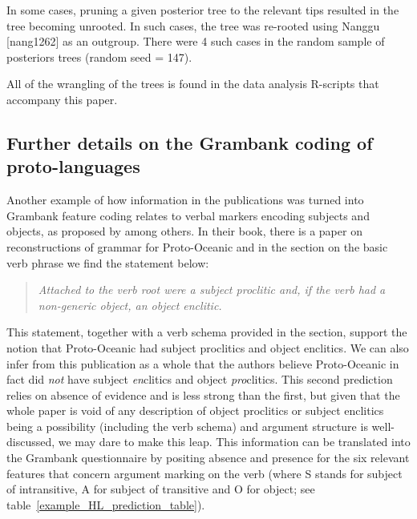 \documentclass[12pt,letterpaper]{article}
\begin{document}
In some cases, pruning a given posterior tree to the relevant tips resulted in the tree becoming unrooted. In such cases, the tree was re-rooted using Nanggu [nang1262] as an outgroup. There were 4 such cases in the random sample of posteriors trees (random seed = 147).

All of the wrangling of the trees is found in the data analysis R-scripts that accompany this paper.



\FloatBarrier    


\subsection{Further details on the Grambank coding of proto-languages }
\label{supp:proto_lg_coding}
Another example of how information in the publications was turned into Grambank feature coding relates to verbal markers encoding subjects and objects, as proposed by \citet{lynchrosscrowley_proto_grammar_oceanic} among others. In their book, there is a paper on reconstructions of grammar for Proto-Oceanic and in the section on the basic verb phrase we find the statement below:

\begin{quotation}
\noindent\emph{Attached to the verb root were a subject proclitic and, if the verb had a non-generic object, an object enclitic.} \end{quotation} \begin{flushright} \citet[83]{lynchrosscrowley_proto_grammar_oceanic} \end{flushright}

This statement, together with a verb schema provided in the section, support the notion that Proto-Oceanic had subject proclitics and object enclitics. We can also infer from this publication as a whole that the authors believe Proto-Oceanic in fact did \emph{not} have subject \emph{en}clitics and object \emph{pro}clitics. This second prediction relies on absence of evidence and is less strong than the first, but given that the whole paper is void of any description of object proclitics or subject enclitics being a possibility (including the verb schema) and argument structure is well-discussed, we may dare to make this leap. This information can be translated into the Grambank questionnaire by positing absence and presence for the six relevant features that concern argument marking on the verb (where S stands for subject of intransitive, A for subject of transitive and O for object; see table~\ref{example_HL_prediction_table}).
\end{document}
